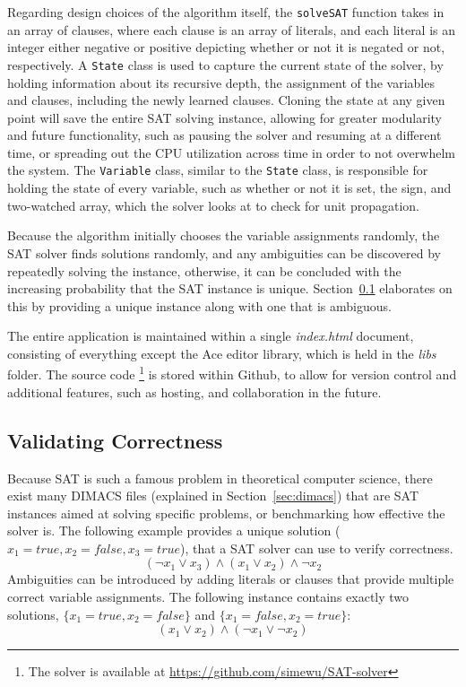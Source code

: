 \documentclass[runningheads]{llncs}
\begin{document}
Regarding design choices of the algorithm itself, the \texttt{solveSAT} function takes in an array of clauses, where each clause is an array of literals, and each literal is an integer either negative or positive depicting whether or not it is negated or not, respectively. A \texttt{State} class is used to capture the current state of the solver, by holding information about its recursive depth, the assignment of the variables and clauses, including the newly learned clauses. Cloning the state at any given point will save the entire SAT solving instance, allowing for greater modularity and future functionality, such as pausing the solver and resuming at a different time, or spreading out the CPU utilization across time in order to not overwhelm the system. The \texttt{Variable} class, similar to the \texttt{State} class, is responsible for holding the state of every variable, such as whether or not it is set, the sign, and two-watched array, which the solver looks at to check for unit propagation.

Because the algorithm initially chooses the variable assignments randomly, the SAT solver finds solutions randomly, and any ambiguities can be discovered by repeatedly solving the instance, otherwise, it can be concluded with the increasing probability that the SAT instance is unique. Section~\ref{sec:validating-correctness} elaborates on this by providing a unique instance along with one that is ambiguous.

The entire application is maintained within a single \emph{index.html} document, consisting of everything except the Ace editor library, which is held in the \emph{libs} folder. The source code \footnote{The solver is available at \url{https://github.com/simewu/SAT-solver}} is stored within Github, to allow for version control and additional features, such as hosting, and collaboration in the future.

\subsection{Validating Correctness}
\label{sec:validating-correctness}
Because SAT is such a famous problem in theoretical computer science, there exist many DIMACS files (explained in Section~\ref{sec:dimacs}) that are SAT instances aimed at solving specific problems, or benchmarking how effective the solver is. The following example provides a unique solution ($x_1=true, x_2=false, x_3=true$), that a SAT solver can use to verify correctness.
$$(\neg x_1 \lor x_3)\land (x_1 \lor x_2)\land \neg x_2$$
Ambiguities can be introduced by adding literals or clauses that provide multiple correct variable assignments. The following instance contains exactly two solutions, $\{x_1=true, x_2=false\}$ and $\{x_1=false, x_2=true\}$:
$$(x_1 \lor x_2)\land (\neg x_1 \lor \neg x_2)$$
\end{document}
